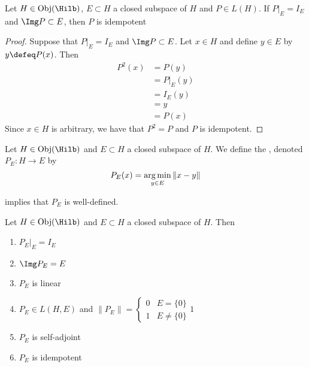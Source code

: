\documentclass{book}
\begin{document}
\begin{ex}
	Let $H \in \Obj(\Hilb)$, $E \subset H$ a closed subspace of $H$ and $P \in L(H)$. If $P|_E = I_E$ and $\Img P \subset E$, then $P$ is idempotent
\end{ex}

\begin{proof}
	Suppose that $P|_E = I_E$ and $\Img P \subset E$. Let $x \in H$ and define $y \in E$ by $y \defeq P(x)$. Then 
	\begin{align*}
		P^2(x)
		& = P(y) \\
		& = P|_E(y) \\
		& = I_E(y) \\
		& = y \\
		& = P(x) 
	\end{align*} 
	Since $x \in H$ is arbitrary, we have that $P^2 = P$ and $P$ is idempotent.
\end{proof}

\begin{defn}
	Let $H \in \Obj(\Hilb)$ and $E \subset H$ a closed subspace of $H$. We define the , denoted $P_E: H \rightarrow E$ by 
	$$P_E(x) = \operatorname*{arg\,min}\limits_{y \in E} \| x - y\|$$
\end{defn}

\begin{note}
	 implies that $P_E$ is well-defined. 
\end{note}

\begin{ex}
	Let $H \in \Obj(\Hilb)$ and $E \subset H$ a closed subspace of $H$. Then 
	\begin{enumerate}
		\item $P_E|_E = I_E$
		\item $\Img P_E = E$
		\item $P_E$ is linear
		\item $P_E \in L(H, E)$ and $\|P_E\| =  
		\begin{cases}
			0 & E = \{0\} \\
			1 & E \neq \{0\}
		\end{cases}1$
		\item $P_E$ is self-adjoint
		\item $P_E$ is idempotent
	\end{enumerate}
\end{ex}
\end{document}

